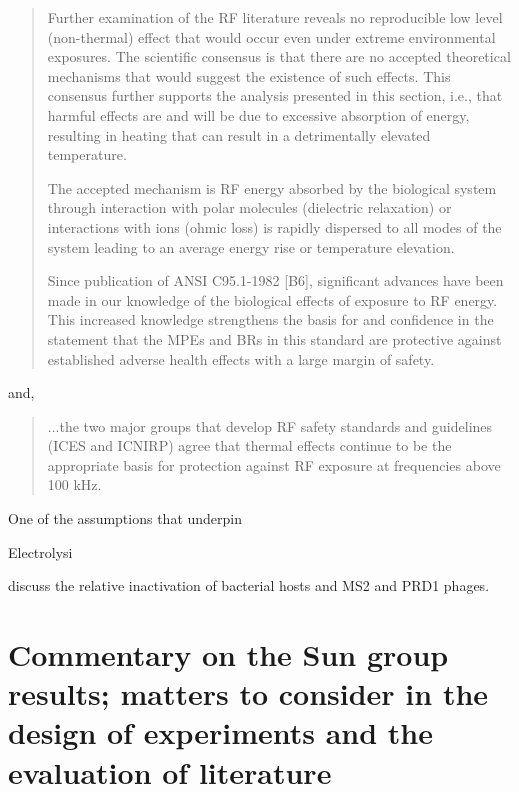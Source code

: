 \documentclass[paper.tex]{subfiles}
\begin{document}
\begin{multicols}{1}
\begin{quote}
	Further examination of the RF literature reveals no reproducible low level (non-thermal) effect that would
	occur even under extreme environmental exposures. The scientific consensus is that there are no accepted
	theoretical mechanisms that would suggest the existence of such effects. This consensus further supports the
	analysis presented in this section, i.e., that harmful effects are and will be due to excessive absorption of
	energy, resulting in heating that can result in a detrimentally elevated temperature. 
	
	The accepted mechanism is RF energy absorbed by the biological system through interaction with polar molecules (dielectric relaxation) or interactions with ions (ohmic loss) is rapidly dispersed to all modes of the system leading to an average energy rise or temperature elevation. 
	
	Since publication of ANSI C95.1-1982 [B6], significant advances have been made in our knowledge of the biological effects of exposure to RF energy. This increased knowledge strengthens the basis for and confidence in the statement that the MPEs and BRs in this	standard are protective against established adverse health effects with a large margin of safety.
\end{quote}

and, 

\begin{quote}
	...the two major groups that develop RF safety standards and
	guidelines (ICES and ICNIRP) agree that thermal effects continue to be the appropriate basis for protection
	against RF exposure at frequencies above 100 kHz.
\end{quote}



One of the assumptions that underpin 



Electrolysi


\cite{comparative2003} discuss the relative inactivation of bacterial hosts and MS2 and PRD1 phages. 



\clearpage
\end{multicols}
\section{Commentary on the Sun group results; matters to consider in the design of experiments and the evaluation of literature}
\end{document}
